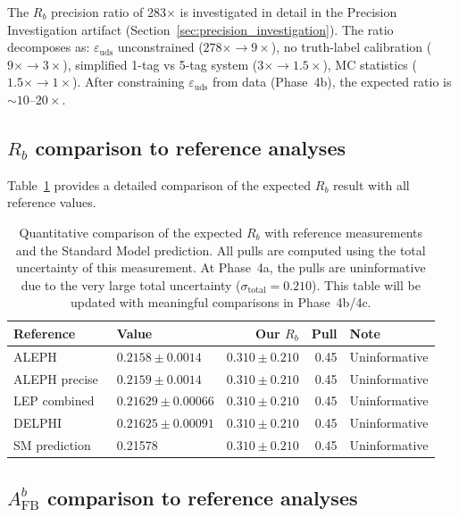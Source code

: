 \documentclass[11pt,a4paper]{article}
\begin{document}
The $R_b$ precision ratio of 283$\times$ is investigated in detail in the Precision
Investigation artifact (Section~\ref{sec:precision_investigation}). The ratio decomposes
as: $\varepsilon_\mathrm{uds}$ unconstrained ($278\times \to 9\times$), no truth-label
calibration ($9\times \to 3\times$), simplified 1-tag vs 5-tag system ($3\times \to 1.5\times$),
MC statistics ($1.5\times \to 1\times$). After constraining $\varepsilon_\mathrm{uds}$
from data (Phase~4b), the expected ratio is $\sim 10$--$20\times$.

\subsection{$R_b$ comparison to reference analyses}
\label{sec:rb_comparison_detail}

Table~\ref{tab:rb_comparison} provides a detailed comparison of the expected $R_b$
result with all reference values.

\begin{table}[htbp]
\centering
\caption{Quantitative comparison of the expected $R_b$ with reference measurements
and the Standard Model prediction. All pulls are computed using the total uncertainty
of this measurement. At Phase~4a, the pulls are uninformative due to the very large
total uncertainty ($\sigma_\mathrm{total} = 0.210$). This table will be updated with
meaningful comparisons in Phase~4b/4c.}
\label{tab:rb_comparison}
\begin{tabular}{llrrl}
\toprule
Reference & Value & Our $R_b$ & Pull & Note \\
\midrule
ALEPH~\cite{ALEPH:Rb:1996} & $0.2158 \pm 0.0014$ & $0.310 \pm 0.210$ & 0.45 & Uninformative \\
ALEPH precise~\cite{ALEPH:Rb:precise} & $0.2159 \pm 0.0014$ & $0.310 \pm 0.210$ & 0.45 & Uninformative \\
LEP combined~\cite{LEP:EWWG:2005} & $0.21629 \pm 0.00066$ & $0.310 \pm 0.210$ & 0.45 & Uninformative \\
DELPHI~\cite{DELPHI:Rb} & $0.21625 \pm 0.00091$ & $0.310 \pm 0.210$ & 0.45 & Uninformative \\
SM prediction~\cite{LEP:EWWG:2005} & 0.21578 & $0.310 \pm 0.210$ & 0.45 & Uninformative \\
\bottomrule
\end{tabular}
\end{table}

\subsection{$A_\mathrm{FB}^b$ comparison to reference analyses}
\label{sec:afb_comparison_detail}
\end{document}
